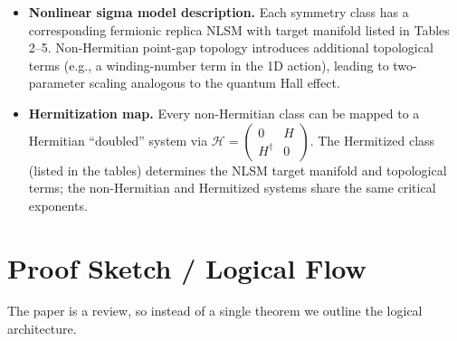 \documentclass[11pt,a4paper]{article}
\begin{document}
\begin{itemize}
  \item \textbf{Nonlinear sigma model description.}  Each symmetry class has a corresponding fermionic replica NLSM with target manifold listed in Tables 2--5.  Non-Hermitian point-gap topology introduces additional topological terms (e.g., a winding-number term in the 1D action), leading to two-parameter scaling analogous to the quantum Hall effect.

  \item \textbf{Hermitization map.}  Every non-Hermitian class can be mapped to a Hermitian ``doubled'' system via $\mathcal{H}=\begin{pmatrix}0 & H \\ H^\dagger & 0\end{pmatrix}$.  The Hermitized class (listed in the tables) determines the NLSM target manifold and topological terms; the non-Hermitian and Hermitized systems share the same critical exponents.
\end{itemize}

\section{Proof Sketch / Logical Flow}
The paper is a review, so instead of a single theorem we outline the logical architecture.
\end{document}
